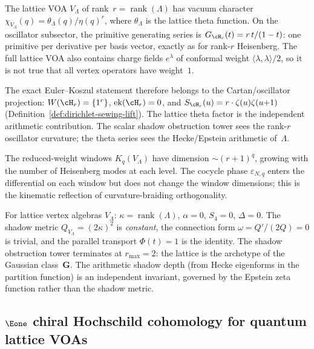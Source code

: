 \begin{remark}
\label{rem:lattice-completion-kinematics}
The lattice VOA $V_\Lambda$ of rank~$r = \operatorname{rank}(\Lambda)$
has vacuum character
$\chi_{V_\Lambda}(q) = \theta_\Lambda(q) / \eta(q)^r$, where
$\theta_\Lambda$ is the lattice theta function. On the oscillator
subsector, the primitive generating series is
$G_{\cH_r}(t) = r\,t/(1-t)$: one primitive per derivative per basis
vector, exactly as for rank-$r$ Heisenberg. The full lattice VOA also
contains charge fields $e^\lambda$ of conformal weight
$\langle\lambda,\lambda\rangle/2$, so it is not true that all
vertex operators have weight~$1$.

The exact Euler--Koszul statement therefore belongs to the
Cartan/oscillator projection:
$W(\cH_r) = \{1^r\}$,
$\operatorname{ek}(\cH_r) = 0$, and
$S_{\cH_r}(u) = r\cdot\zeta(u)\zeta(u{+}1)$
(Definition~\ref{def:dirichlet-sewing-lift}). The lattice theta
factor is the independent arithmetic contribution. The scalar shadow
obstruction tower sees the rank-$r$ oscillator curvature; the theta
series sees the Hecke/Epstein arithmetic of~$\Lambda$.

The reduced-weight windows $K_q(V_\Lambda)$ have dimension
$\sim (r+1)^q$, growing with the number of Heisenberg modes
at each level. The cocycle phase $\varepsilon_{N,q}$ enters the
differential on each window but does not change the window
dimensions; this is the kinematic reflection of curvature-braiding
orthogonality.
\end{remark}

\begin{remark}
\label{rem:lattice-shadow-connection}
For lattice vertex algebras $V_\Lambda$: $\kappa = \operatorname{rank}(\Lambda)$, $\alpha = 0$, $S_4 = 0$, $\Delta = 0$. The shadow metric $Q_{V_\Lambda} = (2\kappa)^2$ is \emph{constant}, the connection form $\omega = Q'/(2Q) = 0$ is trivial, and the parallel transport $\Phi(t) = 1$ is the identity. The shadow obstruction tower terminates at $r_{\max} = 2$: the lattice is the archetype of the Gaussian class~$\mathbf{G}$. The arithmetic shadow depth (from Hecke eigenforms in the partition function) is an independent invariant, governed by the Epstein zeta function rather than the shadow metric.
\end{remark}

\subsection{$\Eone$ chiral Hochschild cohomology for quantum lattice VOAs}
\label{subsec:lattice:e1-hochschild}

